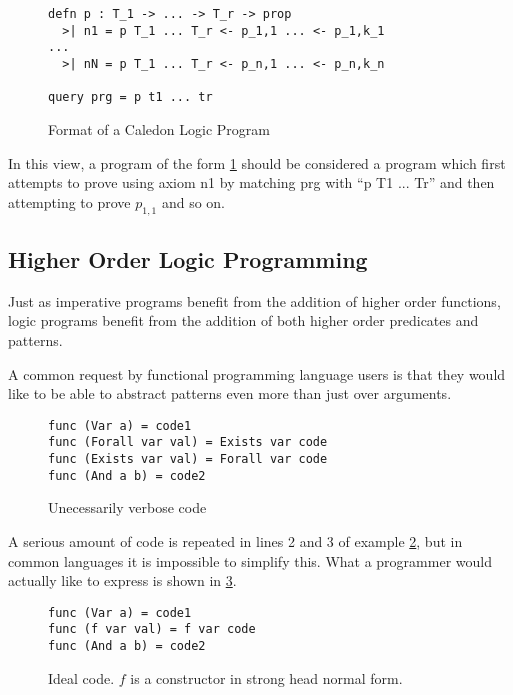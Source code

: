 \begin{figure}[H]
\begin{lstlisting}
defn p : T_1 -> ... -> T_r -> prop
  >| n1 = p T_1 ... T_r <- p_1,1 ... <- p_1,k_1
...
  >| nN = p T_1 ... T_r <- p_n,1 ... <- p_n,k_n

query prg = p t1 ... tr
\end{lstlisting}
\caption{Format of a Caledon Logic Program}
\label{code:format}
\end{figure}

In this view, a program of the form \ref{code:format}
should be considered a program which first attempts to prove using axiom n1 by matching prg with ``p T1 ... Tr'' and then
attempting to prove $p_{1,1}$ and so on.


\FloatBarrier
\subsection{Higher Order Logic Programming}

Just as imperative programs benefit from the addition of higher order functions, logic programs benefit from the addition of both
higher order predicates and patterns.  

A common request by functional programming language users is that they would like to be able to abstract patterns even more than just over
arguments.  

\begin{figure}[H]
\begin{lstlisting}
func (Var a) = code1
func (Forall var val) = Exists var code
func (Exists var val) = Forall var code
func (And a b) = code2
\end{lstlisting}
\caption{Unecessarily verbose code}
\label{code:verbose}
\end{figure}

A serious amount of code is repeated in lines 2 and 3 of example \ref{code:verbose}, 
but in common languages it is impossible to simplify this.
What a programmer would actually like to express is shown in \ref{code:Fideal}.

\begin{figure}[H]
\begin{lstlisting}
func (Var a) = code1
func (f var val) = f var code
func (And a b) = code2
\end{lstlisting}
\caption{Ideal code. $f$ is a constructor in strong head normal form.}
\label{code:Fideal}
\end{figure}


